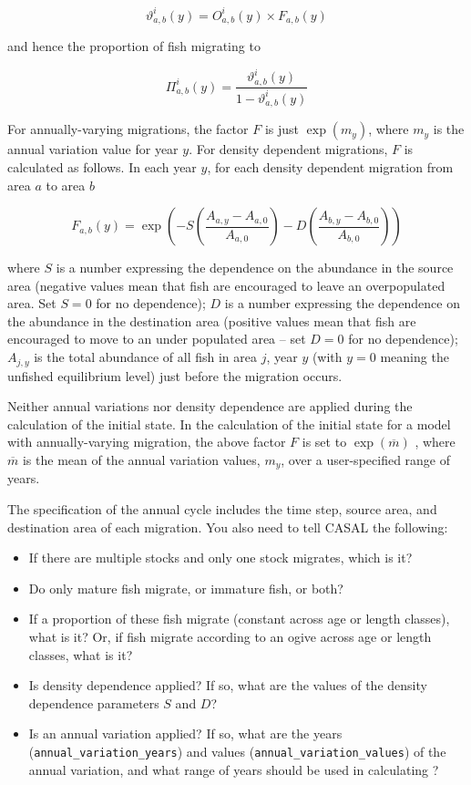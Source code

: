  \begin{equation}
 \vartheta^i_{a,b} (y) = O^i_{a,b}(y) \times F_{a,b}(y)
 \end{equation}

and hence the proportion of fish migrating to

\begin{equation}
\Pi^i_{a,b} (y) = \frac{\vartheta^i_{a,b}(y)}{1 - \vartheta^i_{a,b}(y)}
\end{equation}

For annually-varying migrations, the factor $F$ is just $\exp(m_y)$, where $m_y$ is the annual variation value for year $y$.  For density dependent migrations, $F$ is calculated as follows. In each year $y$, for each density dependent migration from area $a$ to area $b$

 \begin{equation}
 F_{a,b}(y) = \exp \left( -S \left( \frac{A_{a,y} - A_{a,0}}{A_{a,0}}\right) -D \left( \frac{A_{b,y} - A_{b,0}}{A_{b,0}} \right) \right)
 \end{equation}

where $S$ is a number expressing the dependence on the abundance in the source area (negative values mean that fish are encouraged to leave an overpopulated area. Set $S=0$ for no dependence); $D$ is a number expressing the dependence on the abundance in the destination area (positive values mean that fish are encouraged to move to an under populated area \mbox{--} set $D=0$ for no dependence); $A_{j,y}$ is the total abundance of all fish in area $j$, year $y$ (with $y=0$ meaning the unfished equilibrium level) just before the migration occurs.

Neither annual variations nor density dependence are applied during the calculation of the initial state.  In the calculation of the initial state for a model with annually-varying migration, the above factor $F$ is set to $\exp(\overline{m})$  , where $\overline{m}$ is the mean of the annual variation values, $m_y$, over a user-specified range of years. 

The specification of the annual cycle includes the time step, source area, and destination area of each migration. You also need to tell CASAL the following: 

\begin{itemize}
\item If there are multiple stocks and only one stock migrates, which is it?
\item Do only mature fish migrate, or immature fish, or both?
\item If a proportion of these fish migrate (constant across age or length classes), what is it? Or, if fish migrate according to an ogive across age or length classes, what is it?
\item Is density dependence applied? If so, what are the values of the density dependence parameters $S$ and $D$?
\item Is an annual variation applied? If so, what are the years (\texttt{annual\_variation\_years}) and values (\texttt{annual\_variation\_values}) of the annual variation, and what range of years should be used in calculating ?
\end{itemize}

